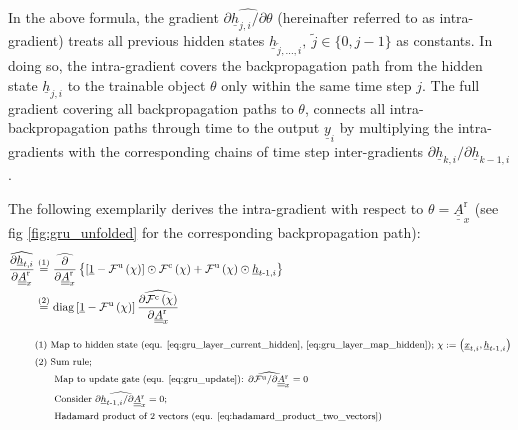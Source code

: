 In the above formula,
the gradient
$\widehat{\partial \underline h_{j, i} / \partial \theta}$
(hereinafter referred to as intra-gradient) 
treats all previous hidden states 
$\underline h_{\tilde j,\dots, i}, \ \tilde j \in \{0, j-1\}$ as constants.
In doing so, the intra-gradient covers the backpropagation path 
from the hidden state 
$\underline h_{j, i}$
to the trainable object 
$\theta$
only within the same time step $j$.
The full gradient covering all backpropagation paths to 
$\theta$, 
connects all intra-backpropagation paths through time to the output 
$\underline y _i$ 
by multiplying the intra-gradients with the corresponding chains 
of time step inter-gradients
$\partial \underline h_{k, i}/\partial \underline h_{k-1, i}$.



The following exemplarily derives the intra-gradient with respect to
$\theta=\underline{\underline{A}}^\text{r}_x$ 
(see fig \ref{fig:gru_unfolded} for the corresponding backpropagation path):
\begin{align} \label{eq:gru_grad_intra_hidden_2_Arx}
    \widehat{\frac{\partial \underline h_{t, i}}{\partial \underline{\underline{A}}^\text{r}_x}}
    &\overset{\textcolor{black}{(1)}}{=}
    \widehat{\frac{\partial}{\partial \underline{\underline{A}}^\text{r}_x}} \left\{
        \left[
            \underline 1 
            -
            \mathcal{F}^\text{u}\left(\chi\right)
        \right]
        \odot
        \mathcal{F}^\text{c} \left(\chi\right)
        +
        \mathcal{F}^\text{u}\left(\chi\right)
        \odot
        \underline h_{t\text -1,i}
    \right\}
    \nonumber \\ &\overset{\textcolor{black}{(2)}}{=}
    \mathrm{diag} \left[
        \underline 1 
        -
        \mathcal{F}^\text{u}\left(\chi\right)
    \right]
    \widehat{
        \frac{\partial \mathcal{F}^\text{c} \left(\chi\right)}
            {\partial \underline{\underline{A}}^\text{r}_x} 
    }
    \\[2ex]
    &\textcolor{black}{\text{\footnotesize (1) 
            Map to hidden state (equ. \ref{eq:gru_layer_current_hidden}, \ref{eq:gru_layer_map_hidden}); 
            $\chi :=  \left(\underline x_{t, i}, \underline h_{t\text{-}1, i}\right)$}} \nonumber \\
    &\textcolor{black}{\text{\footnotesize (2) 
        Sum rule;
    }} \nonumber \\
    &\textcolor{black}{\text{\footnotesize \qquad
        Map to update gate (equ. \ref{eq:gru_update}): 
        $\widehat{\partial \mathcal{F}^\text{u} / \partial \underline{\underline{A}}^\text{r}_x} = 0$ 
    }} \nonumber \\
    &\textcolor{black}{\text{\footnotesize \qquad
        Consider
        $\widehat{\partial \underline h_{t\text -1, i} / \partial \underline{\underline{A}}^\text{r}_x} = 0$;
    }} \nonumber \\
    &\textcolor{black}{\text{\footnotesize \qquad
        Hadamard product of 2 vectors (equ. \ref{eq:hadamard_product_two_vectors})
    }} \nonumber
\end{align}
